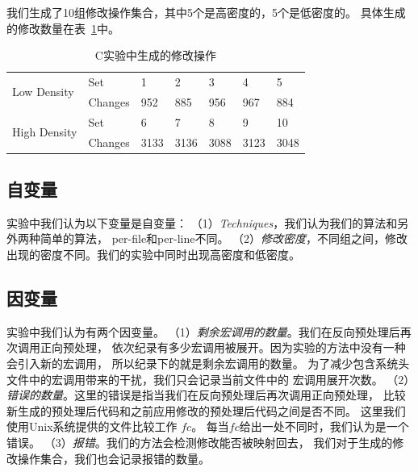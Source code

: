 我们生成了10组修改操作集合，其中5个是高密度的，5个是低密度的。
具体生成的修改数量在表~\ref{tbl:changes}中。
\begin{table}[htbp]
\caption{C实验中生成的修改操作}\label{tbl:changes}
\centering
\begin{tabular}{|l|l|lllll|}
  \hline
  \multirow{2}{2cm}{Low Density} & Set & 1 & 2 & 3 & 4 & 5  \\
  \cline{2-7}
                                 & Changes & 952 & 885 & 956 & 967 & 884 \\
  \hline
  \multirow{2}{2cm}{High Density} & Set & 6 & 7 & 8 & 9 & 10 \\
  \cline{2-7}
                                 & Changes & 3133 & 3136 & 3088 & 3123 & 3048\\
  \hline
\end{tabular}
\end{table}

\subsection{自变量}
实验中我们认为以下变量是自变量：
（1）\emph{Techniques}，我们认为我们的算法和另外两种简单的算法，
per-file和per-line不同。
（2）\emph{修改密度}，不同组之间，修改出现的密度不同。我们的实验中同时出现高密度和低密度。

\subsection{因变量}
实验中我们认为有两个因变量。
（1）\emph{剩余宏调用的数量}。我们在反向预处理后再次调用正向预处理，
  依次纪录有多少宏调用被展开。因为实验的方法中没有一种会引入新的宏调用，
  所以纪录下的就是剩余宏调用的数量。
  为了减少包含系统头文件中的宏调用带来的干扰，我们只会记录当前文件中的
  宏调用展开次数。
（2）\emph{错误的数量}。这里的错误是指当我们在反向预处理后再次调用正向预处理，
  比较新生成的预处理后代码和之前应用修改的预处理后代码之间是否不同。
  这里我们使用Unix系统提供的文件比较工作 $fc$。
  每当$fc$给出一处不同时，我们认为是一个错误。
（3）\emph{报错}。我们的方法会检测修改能否被映射回去，
我们对于生成的修改操作集合，我们也会记录报错的数量。


